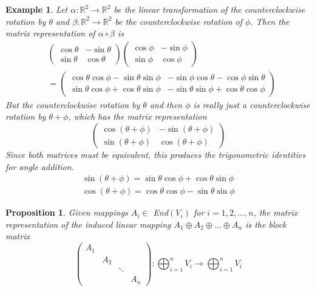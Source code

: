\documentclass{article}
\newtheorem{proposition}[theorem]{Proposition}
\newtheorem{example}{Example}[section]
\theoremstyle{remark}
\theoremstyle{definition}
\begin{document}
\begin{example}
Let $\alpha: \mathbb{R}^2 \longrightarrow \mathbb{R}^2$ be the linear transformation of the counterclockwise rotation by $\theta$ and $\beta: \mathbb{R}^2 \longrightarrow \mathbb{R}^2$ be the counterclockwise rotation of $\phi$. Then the matrix representation of $\alpha \circ \beta$ is 
\begin{align*}
    & \begin{pmatrix}
\cos{\theta} & - \sin{\theta} \\
\sin{\theta} & \cos{\theta}
\end{pmatrix} \begin{pmatrix}
\cos{\phi} & - \sin{\phi} \\
\sin{\phi} & \cos{\phi} 
\end{pmatrix} \\
 & = \begin{pmatrix}
\cos{\theta} \cos{\phi} - \sin{\theta} \sin{\phi} & - \sin{\phi} \cos{\theta} - \cos{\phi} \sin{\theta} \\
\sin{\theta} \cos{\phi} + \cos{\theta} \sin{\phi} & - \sin{\theta} \sin{\phi} + \cos{\theta} \cos{\phi}
\end{pmatrix}
\end{align*}
But the counterclockwise rotation by $\theta$ and then $\phi$ is really just a counterclockwise rotation by $\theta + \phi$, which has the matrix representation
\[\begin{pmatrix}
\cos{(\theta + \phi)} & - \sin{(\theta + \phi)} \\
\sin{(\theta + \phi)} & \cos{(\theta + \phi)}
\end{pmatrix}\]
Since both matrices must be equivalent, this produces the trigonometric identities for angle addition.
\begin{align*}
    \sin{(\theta + \phi)} = \sin{\theta} \cos{\phi} + \cos{\theta} \sin{\phi} \\
    \cos{(\theta + \phi)} = \cos{\theta} \cos{\phi} - \sin{\theta} \sin{\phi}
\end{align*}
\end{example}

\begin{proposition}
Given mappings $A_i \in$ End$(V_i)$ for $i = 1, 2, ..., n$, the matrix representation of the induced linear mapping $A_1 \oplus A_2 \oplus ... \oplus A_n$ is the block matrix 
\[\begin{pmatrix}
A_1 & & & \\
& A_2 & & \\
& & \ddots & \\
& & & A_n
\end{pmatrix}: \bigoplus_{i=1}^n V_i \longrightarrow \bigoplus_{i=1}^n V_i\]
\end{proposition}
\end{document}
